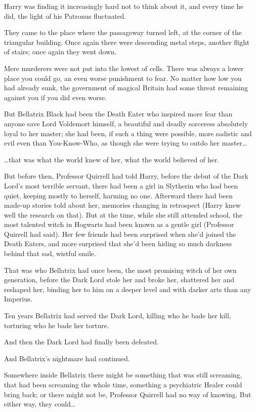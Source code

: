 Harry was finding it increasingly hard not to think about it, and every
time he did, the light of his Patronus fluctuated.

They came to the place where the passageway turned left, at the corner
of the triangular building. Once again there were descending metal
steps, another flight of stairs; once again they went down.

Mere murderers were not put into the lowest of cells. There was always a
lower place you could go, an even worse punishment to fear. No matter
how low you had already sunk, the government of magical Britain had some
threat remaining against you if you did even worse.

But Bellatrix Black had been the Death Eater who inspired more fear than
anyone save Lord Voldemort himself, a beautiful and deadly sorceress
absolutely loyal to her master; she had been, if such a thing were
possible, more sadistic and evil even than You-Know-Who, as though she
were trying to outdo her master\ldots{}

\ldots{}that was what the world knew of her, what the world believed of
her.

But before then, Professor Quirrell had told Harry, before the debut of
the Dark Lord's most terrible servant, there had been a girl in
Slytherin who had been quiet, keeping mostly to herself, harming no one.
Afterward there had been made-up stories told about her, memories
changing in retrospect (Harry knew well the research on that). But at
the time, while she still attended school, the most talented witch in
Hogwarts had been known as a gentle girl (Professor Quirrell had said).
Her few friends had been surprised when she'd joined the Death Eaters,
and more surprised that she'd been hiding so much darkness behind that
sad, wistful smile.

That was who Bellatrix had once been, the most promising witch of her
own generation, before the Dark Lord stole her and broke her, shattered
her and reshaped her, binding her to him on a deeper level and with
darker arts than any Imperius.

Ten years Bellatrix had served the Dark Lord, killing who he bade her
kill, torturing who he bade her torture.

And then the Dark Lord had finally been defeated.

And Bellatrix's nightmare had continued.

Somewhere inside Bellatrix there might be something that was still
screaming, that had been screaming the whole time, something a
psychiatric Healer could bring back; or there might not be, Professor
Quirrell had no way of knowing. But either way, they could\ldots{}


